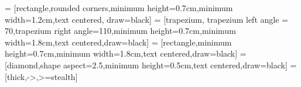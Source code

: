   \Teach{}
  \newtheorem*{Theorem}{定理}
  \makefront
\vspace{-1.5em}
   = [rectangle,rounded corners,minimum height=0.7cm,minimum width=1.2cm,text centered, draw=black]
   = [trapezium, trapezium left angle = 70,trapezium right angle=110,minimum height=0.7cm,minimum width=1.8cm,text centered,draw=black]
   = [rectangle,minimum height=0.7cm,minimum width=1.8cm,text centered,draw=black]
   = [diamond,shape aspect=2.5,minimum height=0.5cm,text centered,draw=black]
   = [thick,->,>=stealth]
\startexercise
